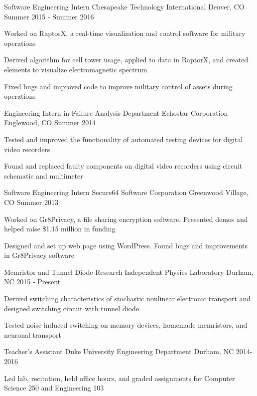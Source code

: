 \documentclass[11pt, a4paper]{resume}
\begin{document}
\begin{cventries}
  \cventry
    {Software Engineering Intern}
    {Chesapeake Technology International}
    {Denver, CO}
    {Summer 2015 - Summer 2016}
    {
      \begin{cvitems}
        \item {Worked on RaptorX, a real-time visualization and control software for military operations}
        \item {Derived algorithm for cell tower usage, applied to data in RaptorX, and created elements to visualize electromagnetic spectrum}
        \item {Fixed bugs and improved code to improve military control of assets during operations}
      \end{cvitems}
    }
  \cventry
    {Engineering Intern in Failure Analysis Department}
    {Echostar Corporation}
    {Englewood, CO}
    {Summer 2014}
    {
      \begin{cvitems}
        \item {Tested and improved the functionality of automated testing devices for digital video recorders}
        \item {Found and replaced faulty components on digital video recorders using circuit schematic and multimeter}
      \end{cvitems}
    }
  \cventry
    {Software Engineering Intern}
    {Secure64 Software Corporation}
    {Greenwood Village, CO}
    {Summer 2013}
    {
      \begin{cvitems}
        \item {Worked on Gr8Privacy, a file sharing encryption software. Presented demos and helped raise \$1.15 million in funding}
        \item {Designed and set up web page using WordPress. Found bugs and improvements in Gr8Privacy software}
      \end{cvitems} 
    }
  \cventry
  	{Memristor and Tunnel Diode Research}
    {Independent Physics Laboratory}
    {Durham, NC}
    {2015 - Present}
    {
      \begin{cvitems}
        \item {Derived switching characteristics of stochastic nonlinear electronic transport and designed switching circuit with tunnel diode}
        \item {Tested noise induced switching on memory devices, homemade memristors, and neuronal transport}
      \end{cvitems}
    }
  \cventry
    {Teacher's Assistant}
    {Duke University Engineering Department}
    {Durham, NC}
    {2014-2016}
    {
      \begin{cvitems}
        \item {Led lab, recitation, held office hours, and graded assignments for Computer Science 250 and Engineering 103}
      \end{cvitems}
    }
\end{cventries}
\end{document}
